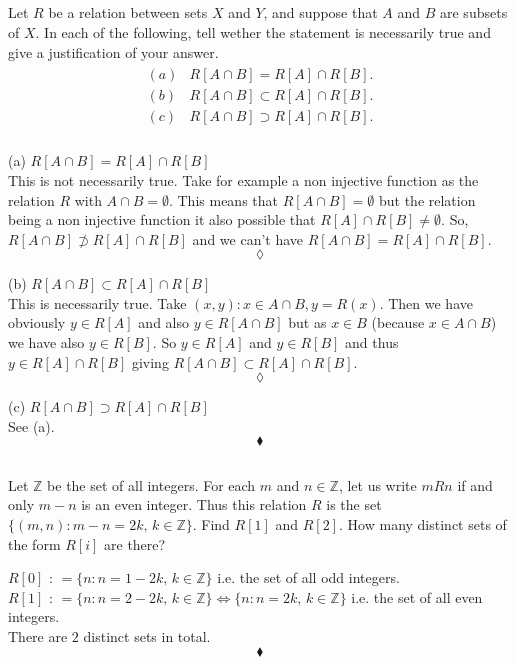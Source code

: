 \subsection{}
\begin{tcolorbox}
 Let $R$ be a relation between sets $X$ and $Y$, and suppose that $A$ and $B$ are subsets of $X$. In each of the following, tell wether the statement is necessarily true and give a justification of your answer. 
 \begin{align*}
\begin{array}{ll}
(a)&R[A\cap B] =R[A]\cap R[B]. \\
(b)&R[A\cap B]\subset R[A]\cap R[B]. \\
(c)&R[A\cap B] \supset R[A]\cap R[B]. \\
\end{array}
\end{align*}
\end{tcolorbox}
(a) $R[A\cap B] =R[A]\cap R[B]$\\
This is not necessarily true. Take for example a non injective function as the relation $R$ with $A\cap B=\emptyset$. This means that  $R[A\cap B] = \emptyset$ but the relation being a non injective function it also possible that $R[A]\cap R[B]\ne \emptyset$. So, $R[A\cap B]\not \supset R[A]\cap R[B]$ and we can't have $R[A\cap B] =R[A]\cap R[B]$.
$$\lozenge$$

(b) $R[A\cap B] \subset R[A]\cap R[B]$\\
This is necessarily true. Take  $(x,y):x\in A\cap B, y=R(x)$. Then we have obviously $y\in R[A]$ and also $y\in R[A\cap B]$ but as $x\in B$ (because $x\in A\cap B$) we have also $y\in R[B]$. So $y\in R[A]$ and $y\in R[B]$ and thus $y \in R[A]\cap R[B]$ giving
$R[A\cap B] \subset R[A]\cap R[B]$. 
$$\lozenge$$

(c) $R[A\cap B] \supset R[A]\cap R[B]$\\
     See (a).
$$\blacklozenge$$

\subsection{}
\begin{tcolorbox}
 Let $\mathbb{Z}$ be the set of all integers. For each $m$ and $n \in\mathbb{Z}$, let us write $mRn$ if and only $m-n$ is an even integer. Thus this relation $R$ is the set $\{(m,n): m-n=2k,\, k\in \mathbb{Z}\}$. Find $R[1]$ and $R[2]$. How many distinct sets of the form $R[i]$ are there?
\end{tcolorbox}
$$ $$ 
\textbf{$R[0]$ }:  $=\{n: n=1-2k,\, k\in \mathbb{Z}\}$ i.e. the set of all odd integers.\\
\textbf{$R[1]$ }: $=\{n: n=2-2k,\, k\in \mathbb{Z}\}\Leftrightarrow \{n: n=2k,\, k\in \mathbb{Z}\}$ i.e. the set of all even integers.\\
There are $2$ distinct sets in total. 
$$\blacklozenge$$

